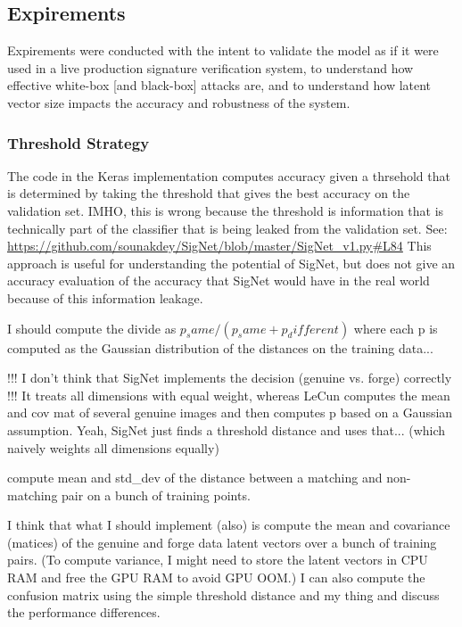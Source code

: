 \subsection{Expirements}

Expirements were conducted with the intent to validate the model as if it were used in a live production signature verification system, to understand how effective white-box [and black-box] attacks are, and to understand how latent vector size impacts the accuracy and robustness of the system.

\subsubsection{Threshold Strategy}

The code in the Keras implementation computes accuracy given a thrsehold that is determined by taking the threshold that gives the best accuracy on the validation set.
IMHO, this is wrong because the threshold is information that is technically part of the classifier that is being leaked from the validation set.
See: \url{https://github.com/sounakdey/SigNet/blob/master/SigNet_v1.py#L84}
This approach is useful for understanding the potential of SigNet, but does not give an accuracy evaluation of the accuracy that SigNet would have in the real world because of this information leakage.


I should compute the divide as $p_same / (p_same + p_different)$ where each p is computed as the Gaussian distribution of the distances on the training data...

!!! I don't think that SigNet implements the decision (genuine vs. forge) correctly !!!
It treats all dimensions with equal weight, whereas LeCun computes the mean and cov mat of several genuine images and then computes p based on a Gaussian assumption.
Yeah, SigNet just finds a threshold distance and uses that... (which naively weights all dimensions equally)

compute mean and std\_dev of the distance between a matching and non-matching pair on a bunch of training points.

I think that what I should implement (also) is compute the mean and covariance (matices) of the genuine and forge data latent vectors over a bunch of training pairs. (To compute variance, I might need to store the latent vectors in CPU RAM and free the GPU RAM to avoid GPU OOM.)
I can also compute the confusion matrix using the simple threshold distance and my thing and discuss the performance differences.

